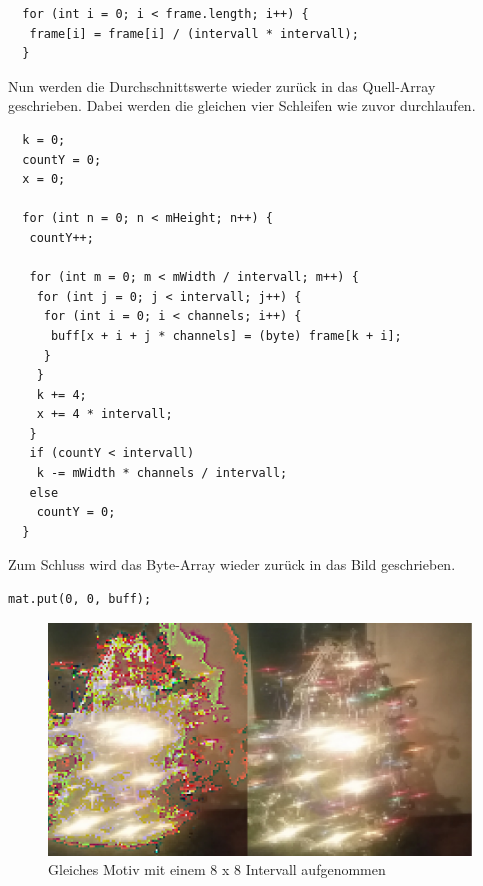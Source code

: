 \begin{description}
\begin{lstlisting}
  for (int i = 0; i < frame.length; i++) {
   frame[i] = frame[i] / (intervall * intervall);
  }
\end{lstlisting}
Nun werden die Durchschnittswerte wieder zurück in das Quell-Array geschrieben. Dabei werden die gleichen vier Schleifen wie zuvor durchlaufen. 
\begin{lstlisting}
  k = 0;
  countY = 0;
  x = 0;

  for (int n = 0; n < mHeight; n++) {
   countY++;

   for (int m = 0; m < mWidth / intervall; m++) {
    for (int j = 0; j < intervall; j++) {
     for (int i = 0; i < channels; i++) {
      buff[x + i + j * channels] = (byte) frame[k + i];
     }
    }
    k += 4;
    x += 4 * intervall;
   }
   if (countY < intervall)
    k -= mWidth * channels / intervall;
   else
    countY = 0;
  }
\end{lstlisting}
Zum Schluss wird das Byte-Array wieder zurück in das Bild geschrieben.
\begin{lstlisting}
mat.put(0, 0, buff);
\end{lstlisting}


\begin{figure}[h]
	\centering
		\includegraphics[width=1.0\textwidth]{img/signedUnsigned.jpg}
	\caption[signedunsigned]{Gleiches Motiv mit einem 8 x 8 Intervall aufgenommen}
	\label{fig:signedunsigned}
\end{figure}

\newpage



\end{description}
